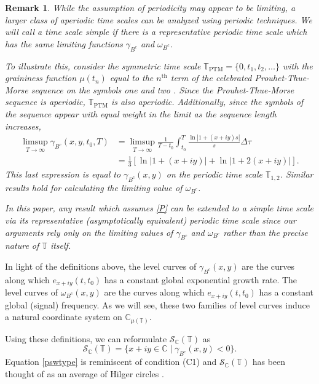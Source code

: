\documentclass[10pt,a4paper]{amsart}
\numberwithin{equation}{section}
\newtheorem{remark}[theorem]{Remark}
\begin{document}
\begin{remark} \rm
While the assumption of periodicity may appear to be limiting, a larger class of
aperiodic time scales can be analyzed using periodic techniques.
We will call a time scale \emph{simple} if there is a representative periodic time
scale which has the same limiting functions $\gamma_{B^c}$ and $\omega_{B^c}$.

To illustrate this, consider the symmetric time scale
$\mathbb{T}_{\text{PTM}} =\{0,t_1,t_2,\ldots\}$ with the graininess function $\mu(t_n)$
 equal to the $n^{\text{th}}$ term of the celebrated Prouhet-Thue-Morse sequence on
the symbols one and two \cite{allouche1999ubiquitous}.
Since the Prouhet-Thue-Morse sequence is aperiodic, $\mathbb{T}_{\text{PTM}}$ is also aperiodic.
Additionally, since the symbols of the sequence appear with equal weight in the limit
as the sequence length increases,
\begin{align*}
 \limsup_{T \to \infty} \gamma_{B^c}(x,y,t_0,T)
&= \limsup_{T \to \infty} \frac{1}{T-t_0} \int_{t_0}^{T} \frac{\ln|1+(x+iy) s|}{s} \Delta \tau\\
&= \frac{1}{3} \left[ \ln|1+(x+iy)| + \ln|1+2(x+iy)| \right].
\end{align*}
This last expression is equal to $\gamma_{B^c}(x,y)$ on the periodic time scale
$\mathbb{T}_{1,2}$. Similar results hold for calculating the limiting value of $\omega_{B^c}$.

In this paper, any result which assumes \eqref{P} can be extended to a simple time
scale via its representative (asymptotically equivalent) periodic time scale since our
arguments rely only on the limiting values of $\gamma_{B^c}$ and $\omega_{B^c}$
rather than the precise nature of $\mathbb{T}$ itself.
\end{remark}

In light of the definitions above, the level curves of $\gamma_{B^c}(x,y)$ are the
curves along which $e_{x+iy}(t,t_0)$ has a constant global exponential growth rate.
The level curves of $\omega_{B^c}(x,y)$ are the curves along which $e_{x+iy}(t,t_0)$
has a constant global (signal) frequency. As we will see, these two families of level
curves induce a natural coordinate system on $\mathbb{C}_{\mu(\mathbb{T})}$.

Using these definitions, we can reformulate $\mathcal{S}_{\mathbb{C}}(\mathbb{T})$ as
\begin{equation}\label{pswtype}
 \mathcal{S}_{\mathbb{C}}(\mathbb{T}) = \{x+iy \in \mathbb{C} \mid \gamma_{B^c}(x,y) <0\}.
\end{equation}
Equation \eqref{pswtype} is reminiscent of condition (C1) and $\mathcal{S}_\mathbb{C}(\mathbb{T})$
has been thought of as an average of Hilger circles \cite{DaGrMaJa}.
\end{document}
